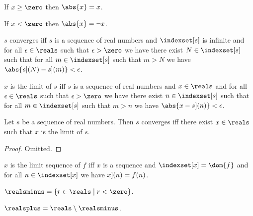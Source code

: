 \begin{axiom}\label{abs_behavior1}
    If $x \geq \zero$ then $\abs{x} = x$.
\end{axiom}

\begin{axiom}\label{abs_behavior2}
    If $x < \zero$ then $\abs{x} = \neg{x}$.
\end{axiom}

\begin{abbreviation}\label{converge}
    $s$ converges iff $s$ is a sequence of real numbers 
    and $\indexset[s]$ is infinite
    and for all $\epsilon \in \reals$ such that $\epsilon > \zero$ we have
    there exist $N \in \indexset[s]$ such that
    for all $m \in \indexset[s]$ such that $m > N$ 
    we have $\abs{\index[s](N) - \index[s](m)} < \epsilon$.
\end{abbreviation}


\begin{definition}\label{limit_of_sequence}
    $x$ is the limit of $s$ iff $s$ is a sequence of real numbers
    and $x \in \reals$ and 
    for all $\epsilon \in \reals$ such that $\epsilon > \zero$
    we have there exist $n \in \indexset[s]$ such that 
    for all $m \in \indexset[s]$ such that $m > n$ 
    we have $\abs{x - \index[s](n)} < \epsilon$.
\end{definition}

\begin{proposition}\label{existence_of_limit}
    Let $s$ be a sequence of real numbers.
    Then $s$ converges iff there exist $x \in \reals$ 
    such that $x$ is the limit of $s$.
\end{proposition}
\begin{proof}
    Omitted.
\end{proof}

\begin{definition}\label{limit_sequence}
    $x$ is the limit sequence of $f$ iff
    $x$ is a sequence and $\indexset[x] = \dom{f}$ and
    for all $n \in \indexset[x]$ we have
    $\index[x](n) = f(n)$.
\end{definition}

\begin{definition}\label{realsminus}
    $\realsminus = \{r \in \reals \mid r < \zero\}$.
\end{definition}

\begin{abbreviation}\label{realsplus}
    $\realsplus = \reals \setminus \realsminus$.
\end{abbreviation}


